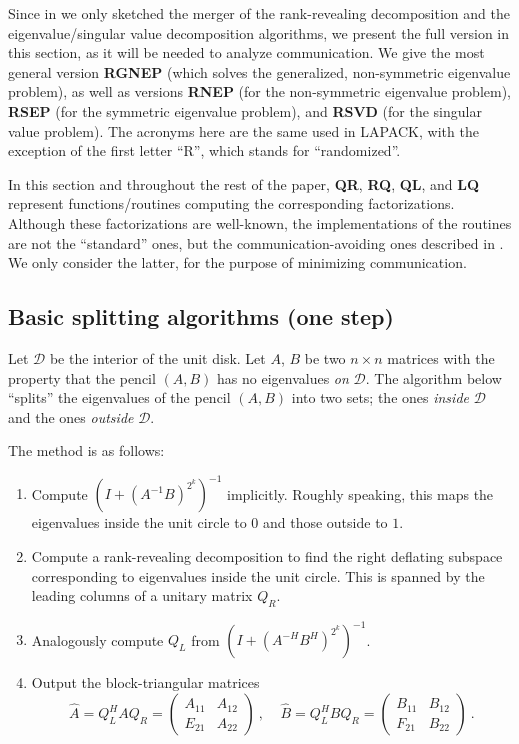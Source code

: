 \documentclass{article}
\theoremstyle{definition}
\begin{document}
Since in \cite{DDH07} we only sketched the merger of the rank-revealing decomposition and the eigenvalue/singular value decomposition algorithms, we present the full version in this section, as it will be needed to analyze communication. We give the most general version \textbf{RGNEP} (which solves the generalized, non-symmetric eigenvalue problem), as well as versions \textbf{RNEP} (for the non-symmetric eigenvalue problem), \textbf{RSEP} (for the symmetric eigenvalue problem), and \textbf{RSVD} (for the singular value problem). The acronyms here are the same used in LAPACK, with the exception of the first letter ``R'', which stands for ``randomized''.

In this section and throughout the rest of the paper, \textbf{QR}, \textbf{RQ}, \textbf{QL}, and \textbf{LQ} represent functions/routines computing the corresponding factorizations. Although these factorizations are well-known, the implementations of the routines are not the ``standard'' ones, but the communication-avoiding ones described in \cite{BDHS10}. We only consider the latter, for the purpose of minimizing communication.

\subsection{Basic splitting algorithms (one step)}

Let $\mathcal{D}$ be the interior of the unit disk. Let $A$, $B$ be two $n \times n$ matrices with the property that the pencil $(A,B)$ has no eigenvalues \emph{on} $\mathcal{D}$. The algorithm below ``splits'' the eigenvalues of the pencil $(A,B)$ into two sets; the ones \emph{inside} $\mathcal{D}$ and the ones \emph{outside} $\mathcal{D}$. 

The method is as follows:
\begin{enumerate}
\item Compute $(I+(A^{-1}B)^{2^k})^{-1}$ implicitly. 
Roughly speaking, this maps the eigenvalues inside the unit circle to $0$ and those outside to $1$.
\item Compute a rank-revealing decomposition to find the right deflating subspace corresponding 
to eigenvalues inside the unit circle. 
This is spanned by the leading columns of a unitary matrix $Q_R$. 
\item Analogously compute $Q_L$ from $(I+(A^{-H}B^H)^{2^k})^{-1}$.
\item Output the block-triangular matrices
\[
\hat{A} = Q_L^H A Q_R = \left ( \begin{array}{cc} A_{11} & A_{12} \\ E_{21} & A_{22} \end{array} \right )~,~~~~~\hat{B} = Q_L^H B Q_R = \left ( \begin{array}{cc} B_{11} & B_{12} \\ F_{21} & B_{22} \end{array} \right )~.
\]
\end{enumerate}
\end{document}

